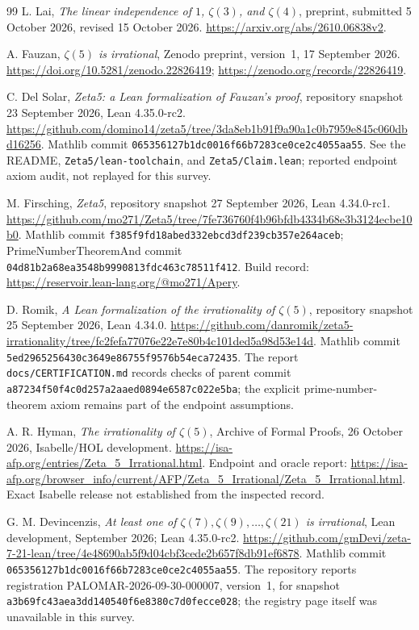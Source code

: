 \documentclass[11pt,letterpaper]{article}
\theoremstyle{definition}
\begin{document}
\begin{thebibliography}{99}
L. Lai, \emph{The linear independence of $1$, $\zeta(3)$, and
$\zeta(4)$}, preprint, submitted 5 October 2026, revised 15 October
2026. \url{https://arxiv.org/abs/2610.06838v2}.

A. Fauzan, \emph{$\zeta(5)$ is irrational}, Zenodo preprint, version~1,
17 September 2026. \url{https://doi.org/10.5281/zenodo.22826419};
\url{https://zenodo.org/records/22826419}.

C. Del Solar, \emph{Zeta5: a Lean formalization of Fauzan's proof},
repository snapshot 23 September 2026, Lean 4.35.0-rc2.
\url{https://github.com/domino14/zeta5/tree/3da8eb1b91f9a90a1c0b7959e845c060dbd16256}.
Mathlib commit \texttt{065356127b1dc0016f66b7283ce0ce2c4055aa55}.
See the README, \texttt{Zeta5/lean-toolchain}, and
\texttt{Zeta5/Claim.lean}; reported endpoint axiom audit, not replayed
for this survey.

M. Firsching, \emph{Zeta5}, repository snapshot 27 September 2026,
Lean 4.34.0-rc1.
\url{https://github.com/mo271/Zeta5/tree/7fe736760f4b96bfdb4334b68e3b3124ecbe10b0}.
Mathlib commit \texttt{f385f9fd18abed332ebcd3df239cb357e264aceb};
PrimeNumberTheoremAnd commit
\texttt{04d81b2a68ea3548b9990813fdc463c78511f412}.
Build record: \url{https://reservoir.lean-lang.org/@mo271/Apery}.

D. Romik, \emph{A Lean formalization of the irrationality of
$\zeta(5)$}, repository snapshot 25 September 2026, Lean 4.34.0.
\url{https://github.com/danromik/zeta5-irrationality/tree/fc2fefa77076e22e7e80b4c101ded5a98d53e14d}.
Mathlib commit \texttt{5ed2965256430c3649e86755f9576b54eca72435}.
The report \texttt{docs/CERTIFICATION.md} records checks of parent
commit \texttt{a87234f50f4c0d257a2aaed0894e6587c022e5ba}; the explicit
prime-number-theorem axiom remains part of the endpoint assumptions.

A. R. Hyman, \emph{The irrationality of $\zeta(5)$}, Archive of
Formal Proofs, 26 October 2026, Isabelle/HOL development.
\url{https://isa-afp.org/entries/Zeta_5_Irrational.html}.
Endpoint and oracle report:
\url{https://isa-afp.org/browser_info/current/AFP/Zeta_5_Irrational/Zeta_5_Irrational.html}.
Exact Isabelle release not established from the inspected record.

G. M. Devincenzis, \emph{At least one of
$\zeta(7),\zeta(9),\ldots,\zeta(21)$ is irrational}, Lean development,
September 2026; Lean 4.35.0-rc2.
\url{https://github.com/gmDevi/zeta-7-21-lean/tree/4e48690ab5f9d04cbf3cede2b657f8db91ef6878}.
Mathlib commit \texttt{065356127b1dc0016f66b7283ce0ce2c4055aa55}.
The repository reports registration PALOMAR-2026-09-30-000007, version~1,
for snapshot \texttt{a3b69fc43aea3dd140540f6e8380c7d0fecce028}; the
registry page itself was unavailable in this survey.


\end{thebibliography}
\end{document}
